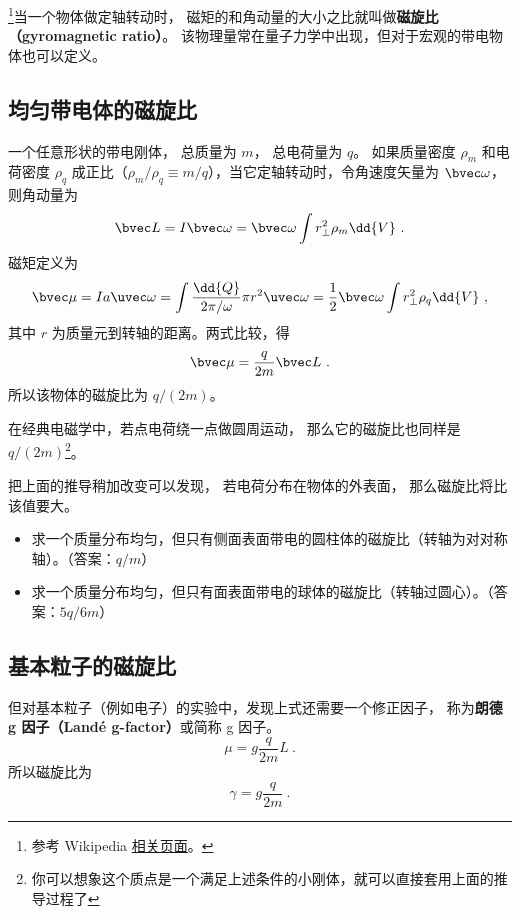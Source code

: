 


\footnote{参考 Wikipedia \href{https://en.wikipedia.org/wiki/Gyromagnetic_ratio}{相关页面}。}当一个物体做定轴转动时， 磁矩的和角动量的大小之比就叫做\textbf{磁旋比（gyromagnetic ratio）}。 该物理量常在量子力学中出现，但对于宏观的带电物体也可以定义。

\subsection{均匀带电体的磁旋比}
一个任意形状的带电刚体， 总质量为 $m$， 总电荷量为 $q$。 如果质量密度 $\rho_m$ 和电荷密度 $\rho_q$ 成正比（$\rho_m/\rho_q \equiv m/q$），当它定轴转动时，令角速度矢量为 $\bvec\omega$， 则角动量为
\begin{equation}
\bvec L = I\bvec \omega  = \bvec \omega \int r_\bot^2 \rho_m \dd{V}~.
\end{equation}
磁矩定义为
\begin{equation}
\bvec \mu  = Ia \uvec\omega = \int \frac{\dd{Q}}{2\pi/\omega}  \pi r^2 \uvec \omega
= \frac12 \bvec \omega \int r_\bot^2\rho_q \dd{V} ~,
\end{equation}
其中 $r$ 为质量元到转轴的距离。两式比较，得
\begin{equation}
\bvec \mu  = \frac{q}{2m} \bvec L~.
\end{equation}
所以该物体的磁旋比为 $q/(2m)$。

在经典电磁学中，若点电荷绕一点做圆周运动， 那么它的磁旋比也同样是 $q/(2m)$\footnote{你可以想象这个质点是一个满足上述条件的小刚体，就可以直接套用上面的推导过程了}。

把上面的推导稍加改变可以发现， 若电荷分布在物体的外表面， 那么磁旋比将比该值要大。
\begin{exercise}{}
\begin{itemize}
\item 求一个质量分布均匀，但只有侧面表面带电的圆柱体的磁旋比（转轴为对对称轴）。（答案：$q/m$）
\item 求一个质量分布均匀，但只有面表面带电的球体的磁旋比（转轴过圆心）。（答案：$5q/6m$）
\end{itemize}
\end{exercise}

\subsection{基本粒子的磁旋比}
但对基本粒子（例如电子）的实验中，发现上式还需要一个修正因子， 称为\textbf{朗德 g 因子（Landé g-factor）}或简称 g 因子。
\begin{equation}\label{eq_BohMag_4}
\mu  = g\frac{q}{2m} L~.
\end{equation}
所以磁旋比为
\begin{equation}
\gamma  = g\frac{q}{2m}~.
\end{equation}

